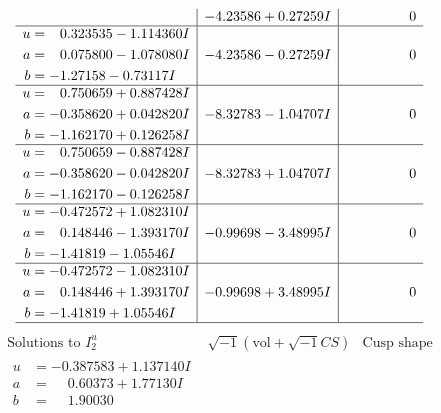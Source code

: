 \documentclass[1p]{elsarticle_modified}
\theoremstyle{definition}
\newcommand{\I}{\sqrt{-1}}
\begin{document}
$$\begin{array}{c|c|c}
 & -4.23586 + 0.27259 I & \phantom{-0.000000 } 0 \\ \hline\begin{aligned}
u &= \phantom{-}0.323535 - 1.114360 I \\
a &= \phantom{-}0.075800 - 1.078080 I \\
b &= -1.27158 - 0.73117 I\end{aligned}
 & -4.23586 - 0.27259 I & \phantom{-0.000000 } 0 \\ \hline\begin{aligned}
u &= \phantom{-}0.750659 + 0.887428 I \\
a &= -0.358620 + 0.042820 I \\
b &= -1.162170 + 0.126258 I\end{aligned}
 & -8.32783 - 1.04707 I & \phantom{-0.000000 } 0 \\ \hline\begin{aligned}
u &= \phantom{-}0.750659 - 0.887428 I \\
a &= -0.358620 - 0.042820 I \\
b &= -1.162170 - 0.126258 I\end{aligned}
 & -8.32783 + 1.04707 I & \phantom{-0.000000 } 0 \\ \hline\begin{aligned}
u &= -0.472572 + 1.082310 I \\
a &= \phantom{-}0.148446 - 1.393170 I \\
b &= -1.41819 - 1.05546 I\end{aligned}
 & -0.99698 - 3.48995 I & \phantom{-0.000000 } 0 \\ \hline\begin{aligned}
u &= -0.472572 - 1.082310 I \\
a &= \phantom{-}0.148446 + 1.393170 I \\
b &= -1.41819 + 1.05546 I\end{aligned}
 & -0.99698 + 3.48995 I & \phantom{-0.000000 } 0\\
 \hline 
 \end{array}$$\newpage$$\begin{array}{c|c|c}  
\text{Solutions to }I^u_{2}& \I (\text{vol} + \sqrt{-1}CS) & \text{Cusp shape}\\
 \hline 
\begin{aligned}
u &= -0.387583 + 1.137140 I \\
a &= \phantom{-}0.60373 + 1.77130 I \\
b &= \phantom{-}1.90030\phantom{ +0.000000I}\end{aligned}

\end{array}$$
\end{document}
